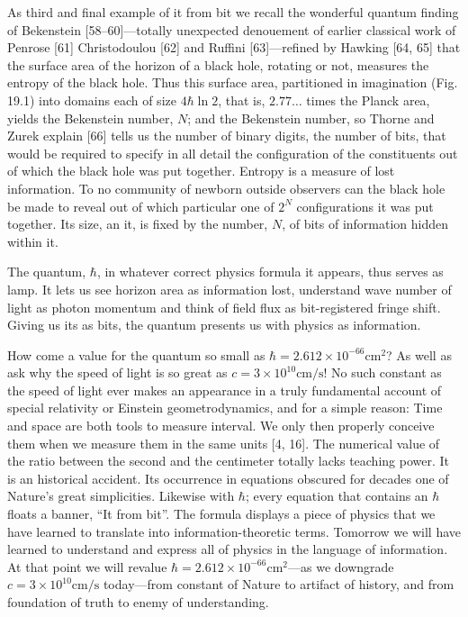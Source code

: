 \documentclass[11pt]{article}
\begin{document}
	As third and final example of it from bit we recall the wonderful quantum
	finding of Bekenstein [58--60]---totally unexpected denouement of earlier classical
	work of Penrose [61] Christodoulou [62] and Ruffini [63]---refined by Hawking [64,
	65] that the surface area of the horizon of a black hole, rotating or not, measures
	the entropy of the black hole. Thus this surface area, partitioned in imagination
	(Fig. 19.1) into domains each of size $4\hbar \ln 2$, that is, $2.77\ldots$ times the Planck area,
	yields the Bekenstein number, $N$; and the Bekenstein number, so Thorne and Zurek
	explain [66] tells us the number of binary digits, the number of bits, that would be
	required to specify in all detail the configuration of the constituents out of which
	the black hole was put together. Entropy is a measure of lost information. To no
	community of newborn outside observers can the black hole be made to reveal out
	of which particular one of $2^N$ configurations it was put together. Its size, an it, is
	fixed by the number, $N$, of bits of information hidden within it.
	
	The quantum, $\hbar$, in whatever correct physics formula it appears, thus serves as
	lamp. It lets us see horizon area as information lost, understand wave number of
	light as photon momentum and think of field flux as bit-registered fringe shift.
	Giving us its as bits, the quantum presents us with physics as information.
	
	How come a value for the quantum so small as $\hbar = 2.612 \times 10^{-66} \text{cm}^2$? As well
	as ask why the speed of light is so great as $c = 3 \times 10^{10} \text{cm/s}$! No such constant
	as the speed of light ever makes an appearance in a truly fundamental account
	of special relativity or Einstein geometrodynamics, and for a simple reason: Time
	and space are both tools to measure interval. We only then properly conceive
	them when we measure them in the same units [4, 16]. The numerical value of
	the ratio between the second and the centimeter totally lacks teaching power. It
	is an historical accident. Its occurrence in equations obscured for decades one of
	Nature's great simplicities. Likewise with $\hbar$; every equation that contains an $\hbar$
	floats a banner, ``It from bit''. The formula displays a piece of physics that we
	have learned to translate into information-theoretic terms. Tomorrow we will have
	learned to understand and express all of physics in the language of information. At
	that point we will revalue $\hbar = 2.612 \times 10^{-66} \text{cm}^2$---as we downgrade $c = 3 \times 10^{10} \text{cm/s}$ today---from constant of Nature to artifact of history, and from foundation
	of truth to enemy of understanding.
	
\end{document}
